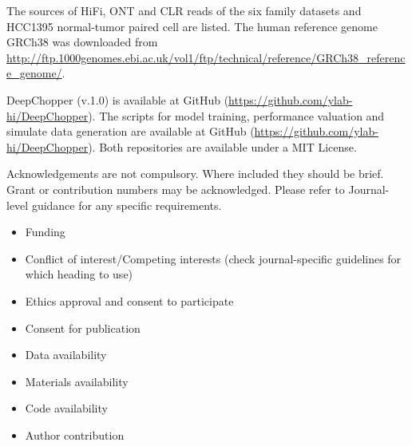 \documentclass[pdflatex, sn-mathphys-num, lineno]{sn-jnl}%
\theoremstyle{thmstyleone}%
\theoremstyle{thmstyletwo}%
\theoremstyle{thmstylethree}%
\begin{document}
\backmatter



The sources of HiFi, ONT and CLR reads of the six family datasets and HCC1395 normal-tumor paired cell are listed.
The human reference genome GRCh38 was downloaded from \url{http://ftp.1000genomes.ebi.ac.uk/vol1/ftp/technical/reference/GRCh38\_reference\_genome/}.


DeepChopper (v.1.0) is available at GitHub (\url{https://github.com/ylab-hi/DeepChopper}).
The scripts for model training, performance valuation and simulate data generation are available at GitHub (\url{https://github.com/ylab-hi/DeepChopper}).
Both repositories are available under a MIT License.


Acknowledgements are not compulsory. Where included they should be brief. Grant or contribution numbers may be acknowledged.
Please refer to Journal-level guidance for any specific requirements.



\begin{itemize}
	\item Funding
	\item Conflict of interest/Competing interests (check journal-specific guidelines for which heading to use)
	\item Ethics approval and consent to participate
	\item Consent for publication
	\item Data availability
	\item Materials availability
	\item Code availability
	\item Author contribution
\end{itemize}
\end{document}
